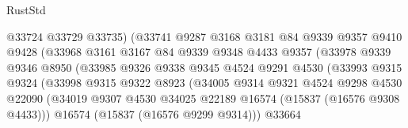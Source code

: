 \begin{lexlean}{RustStd}
\begin{coremodule}
                                  @33724
                                  @33729
                                  @33735)
                                (@33741
                                  @9287
                                  @3168
                                  @3181
                                  @84
                                  @9339
                                  @9357
                                  @9410
                                  @9428
                                  (@33968
                                    @3161
                                    @3167
                                    @84
                                    @9339
                                    @9348
                                    @4433
                                    @9357
                                    (@33978
                                      @9339
                                      @9346
                                      @8950
                                      (@33985
                                        @9326
                                        @9338
                                        @9345
                                        @4524
                                        @9291
                                        @4530
                                        (@33993
                                          @9315
                                          @9324
                                          (@33998
                                            @9315
                                            @9322
                                            @8923
                                            (@34005
                                              @9314
                                              @9321
                                              @4524
                                              @9298
                                              @4530
                                              @22090
                                              (@34019
                                                @9307
                                                @4530
                                                @34025
                                                @22189
                                                @16574
                                                (@15837 (@16576 @9308 @4433)))
                                              @16574
                                              (@15837 (@16576 @9299 @9314)))
                                            @33664

\end{coremodule}
\end{lexlean}
